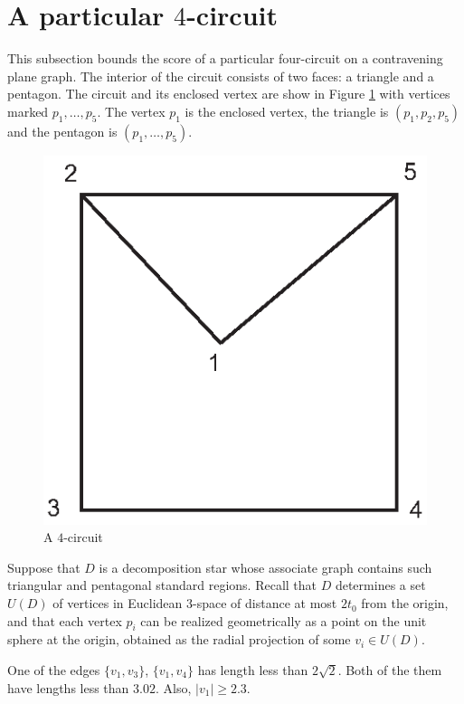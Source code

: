 \section{A particular $4$-circuit}

This subsection bounds the score of a particular four-circuit on a
contravening plane graph.  The interior of the circuit consists of
two faces: a triangle and a pentagon.  The circuit and its
enclosed vertex are show in Figure \ref{fig:no4circuit} with
vertices marked $p_1,\ldots,p_5$.  The vertex $p_1$ is the
enclosed vertex, the triangle is $(p_1,p_2,p_5)$ and the pentagon
is $(p_1,\ldots,p_5)$.

\begin{figure}[htb]
  \centering
  \includegraphics{PS/no4circuit.eps}
  \caption{A $4$-circuit}
  \label{fig:no4circuit}
\end{figure}

Suppose that $D$ is a decomposition star whose associate graph
contains such triangular and pentagonal standard regions.  Recall
that $D$ determines a set $U(D)$ of vertices in Euclidean $3$-space
of distance at most $2t_0$ from the origin, and that each vertex
$p_i$ can be realized geometrically as a point on the unit sphere at
the origin, obtained as the radial projection of some $v_i\in U(D)$.

\begin{lemma}  One of the edges $\{v_1,v_3\}$, $\{v_1,v_4\}$ has
length less than $2\sqrt{2}$.  Both of the them have lengths less
than $3.02$. Also, $|v_1|\ge2.3$.
\end{lemma}

